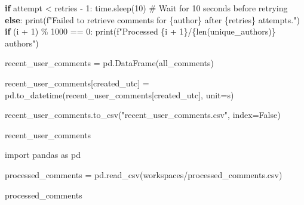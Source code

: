 \documentclass[
  12pt,
  letterpaper,
  DIV=11,
  numbers=noendperiod]{scrartcl}
\newenvironment{Shaded}{\begin{snugshade}}{\end{snugshade}}
\newcommand{\BuiltInTok}[1]{\textcolor[rgb]{0.00,0.23,0.31}{#1}}
\newcommand{\CommentTok}[1]{\textcolor[rgb]{0.37,0.37,0.37}{#1}}
\newcommand{\ControlFlowTok}[1]{\textcolor[rgb]{0.00,0.23,0.31}{\textbf{#1}}}
\newcommand{\DecValTok}[1]{\textcolor[rgb]{0.68,0.00,0.00}{#1}}
\newcommand{\ImportTok}[1]{\textcolor[rgb]{0.00,0.46,0.62}{#1}}
\newcommand{\NormalTok}[1]{\textcolor[rgb]{0.00,0.23,0.31}{#1}}
\newcommand{\OperatorTok}[1]{\textcolor[rgb]{0.37,0.37,0.37}{#1}}
\newcommand{\SpecialCharTok}[1]{\textcolor[rgb]{0.37,0.37,0.37}{#1}}
\newcommand{\SpecialStringTok}[1]{\textcolor[rgb]{0.13,0.47,0.30}{#1}}
\newcommand{\StringTok}[1]{\textcolor[rgb]{0.13,0.47,0.30}{#1}}
\newcommand{\VariableTok}[1]{\textcolor[rgb]{0.07,0.07,0.07}{#1}}
\begin{document}
\begin{Shaded}
\begin{Highlighting}[]
            \ControlFlowTok{if}\NormalTok{ attempt }\OperatorTok{\textless{}}\NormalTok{ retries }\OperatorTok{{-}} \DecValTok{1}\NormalTok{:}
\NormalTok{                time.sleep(}\DecValTok{10}\NormalTok{)  }\CommentTok{\# Wait for 10 seconds before retrying}
            \ControlFlowTok{else}\NormalTok{:}
                \BuiltInTok{print}\NormalTok{(}\SpecialStringTok{f"Failed to retrieve comments for }\SpecialCharTok{\{}\NormalTok{author}\SpecialCharTok{\}}\SpecialStringTok{ after }\SpecialCharTok{\{}\NormalTok{retries}\SpecialCharTok{\}}\SpecialStringTok{ attempts."}\NormalTok{)}
    \ControlFlowTok{if}\NormalTok{ (i }\OperatorTok{+} \DecValTok{1}\NormalTok{) }\OperatorTok{\%} \DecValTok{1000} \OperatorTok{==} \DecValTok{0}\NormalTok{:}
        \BuiltInTok{print}\NormalTok{(}\SpecialStringTok{f"Processed }\SpecialCharTok{\{}\NormalTok{i }\OperatorTok{+} \DecValTok{1}\SpecialCharTok{\}}\SpecialStringTok{/}\SpecialCharTok{\{}\BuiltInTok{len}\NormalTok{(unique\_authors)}\SpecialCharTok{\}}\SpecialStringTok{ authors"}\NormalTok{)}

\NormalTok{recent\_user\_comments }\OperatorTok{=}\NormalTok{ pd.DataFrame(all\_comments)}

\NormalTok{recent\_user\_comments[}\StringTok{\textquotesingle{}created\_utc\textquotesingle{}}\NormalTok{] }\OperatorTok{=}\NormalTok{ pd.to\_datetime(recent\_user\_comments[}\StringTok{\textquotesingle{}created\_utc\textquotesingle{}}\NormalTok{], unit}\OperatorTok{=}\StringTok{\textquotesingle{}s\textquotesingle{}}\NormalTok{)}

\NormalTok{recent\_user\_comments.to\_csv(}\StringTok{"recent\_user\_comments.csv"}\NormalTok{, index}\OperatorTok{=}\VariableTok{False}\NormalTok{)}

\NormalTok{recent\_user\_comments}
\end{Highlighting}
\end{Shaded}

\begin{Shaded}
\begin{Highlighting}[]
\ImportTok{import}\NormalTok{ pandas }\ImportTok{as}\NormalTok{ pd}

\NormalTok{processed\_comments }\OperatorTok{=}\NormalTok{ pd.read\_csv(}\StringTok{\textquotesingle{}workspaces/processed\_comments.csv\textquotesingle{}}\NormalTok{)}

\NormalTok{processed\_comments}
\end{Highlighting}
\end{Shaded}
\end{document}
